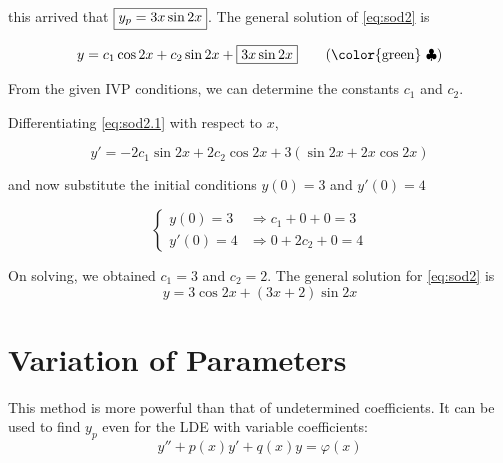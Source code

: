 \begin{solution}
    this arrived that $\fbox{$y_p = 3x \sin 2x$}$. The general solution of \eqref{eq:sod2} is 

    \begin{equation*}
        y = c_1 \cos 2x + c_2 \sin 2x + \fbox{$3x \sin 2x$} \label{eq:sod2.1} \tag{{\color{green} $\clubsuit$}}
    \end{equation*}

    From the given IVP conditions, we can determine the constants $c_1$ and $c_2$.
    
    Differentiating \eqref{eq:sod2.1} with respect to $x$,

    \[
        y' = - 2 c_1 \sin 2x + 2 c_2 \cos 2x + 3 (\sin 2x + 2x \cos 2x)
    \]

    and now substitute the initial conditions $y(0) = 3$ and $y'(0) = 4$

    \begin{equation*}
        \begin{cases}
            y(0) = 3 &\Rightarrow c_1 + 0 + 0 = 3\\
            y'(0) = 4 &\Rightarrow 0 + 2c_2 + 0 = 4
        \end{cases}
    \end{equation*}

    On solving, we obtained $c_1 = 3$ and $c_2 = 2$. The general solution for 
    \eqref{eq:sod2} is 
    \[
        y = 3 \cos 2x + (3x + 2) \sin 2x
    \]

\end{solution}

\section{Variation of Parameters}

This method is more powerful than that of undetermined coefficients. It can be used to find 
$y_p$ even for the LDE with variable coefficients:
\begin{equation}
    y'' + p(x)y' + q(x)y = \varphi(x)
\end{equation}

